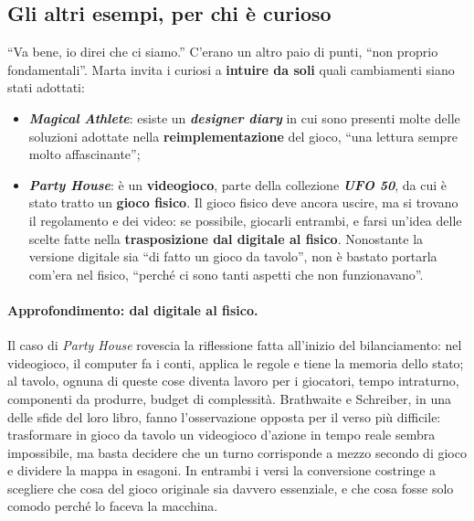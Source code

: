 \subsection{Gli altri esempi, per chi è curioso}



``Va bene, io direi che ci siamo.'' C'erano un altro paio di punti, ``non proprio
fondamentali''. Marta invita i curiosi a \textbf{intuire da soli} quali cambiamenti siano stati
adottati:
\begin{itemize}
  \item \textbf{\emph{Magical Athlete}}: esiste un \textbf{\emph{designer diary}} in cui sono
        presenti molte delle soluzioni adottate nella \textbf{reimplementazione} del gioco,
        ``una lettura sempre molto affascinante'';
  \item \textbf{\emph{Party House}}: è un \textbf{videogioco}, parte della collezione
        \textbf{\emph{UFO 50}}, da cui è stato tratto un \textbf{gioco fisico}. Il gioco fisico
        deve ancora uscire, ma si trovano il regolamento e dei video: se possibile, giocarli
        entrambi, e farsi un'idea delle scelte fatte nella \textbf{trasposizione dal digitale al
        fisico}. Nonostante la versione digitale sia ``di fatto un gioco da tavolo'', non è
        bastato portarla com'era nel fisico, ``perché ci sono tanti aspetti che non
        funzionavano''.
\end{itemize}

\paragraph{Approfondimento: dal digitale al fisico.} Il caso di \emph{Party House} rovescia la
riflessione fatta all'inizio del bilanciamento: nel videogioco, il computer fa i conti, applica
le regole e tiene la memoria dello stato; al tavolo, ognuna di queste cose diventa lavoro per i
giocatori, tempo intraturno, componenti da produrre, budget di complessità. Brathwaite e
Schreiber, in una delle sfide del loro libro, fanno l'osservazione opposta per il verso più
difficile: trasformare in gioco da tavolo un videogioco d'azione in tempo reale sembra
impossibile, ma basta decidere che un turno corrisponde a mezzo secondo di gioco e dividere la
mappa in esagoni. In entrambi i versi la conversione costringe a scegliere che cosa del gioco
originale sia davvero essenziale, e che cosa fosse solo comodo perché lo faceva la macchina.

